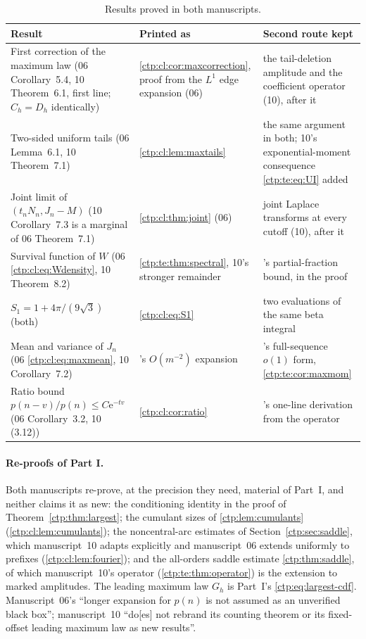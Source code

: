 \documentclass[11pt,a4paper]{article}
\numberwithin{equation}{section}
\theoremstyle{definition}
\theoremstyle{remark}
\newcommand{\e}{\mathrm e}
\begin{document}
\begin{table}[htbp]
\centering\small
\renewcommand{\arraystretch}{1.12}
\begin{tabular}{@{}>{\raggedright\arraybackslash}p{}>{\raggedright\arraybackslash}p{}>{\raggedright\arraybackslash}p{}@{}}
\toprule
Result & Printed as & Second route kept\\
\midrule
First correction of the maximum law (06 Corollary~5.4, 10 Theorem~6.1,
first line; $C_h=D_h$ identically) &
\cref{ctp:cl:cor:maxcorrection}, proof from the $L^1$ edge expansion
(06) &
the tail-deletion amplitude and the coefficient operator (10), after it\\
Two-sided uniform tails (06 Lemma~6.1, 10 Theorem~7.1) &
\cref{ctp:cl:lem:maxtails} &
the same argument in both; 10's exponential-moment consequence
\eqref{ctp:te:eq:UI} added\\
Joint limit of $(t_nN_n,J_n-M)$ (10 Corollary~7.3 is a marginal of 06
Theorem~7.1) &
\cref{ctp:cl:thm:joint} (06) &
joint Laplace transforms at every cutoff (10), after it\\
Survival function of $W$ (06 \eqref{ctp:cl:eq:Wdensity}, 10 Theorem~8.2) &
\cref{ctp:te:thm:spectral}, 10's stronger remainder &
06's partial-fraction bound, in the proof\\
$S_1=1+4\pi/(9\sqrt3)$ (both) &
\eqref{ctp:cl:eq:S1} &
two evaluations of the same beta integral\\
Mean and variance of $J_n$ (06 \eqref{ctp:cl:eq:maxmean}, 10
Corollary~7.2) &
06's $O(m^{-2})$ expansion &
10's full-sequence $o(1)$ form, \cref{ctp:te:cor:maxmom}\\
Ratio bound $p(n-v)/p(n)\le C\e^{-tv}$ (06 Corollary~3.2, 10 (3.12)) &
\cref{ctp:cl:cor:ratio} &
10's one-line derivation from the operator\\
\bottomrule
\end{tabular}
\caption{Results proved in both manuscripts.}
\label{ctp:cl:tab:shared}
\end{table}

\paragraph{Re-proofs of Part I.} Both manuscripts re-prove, at the
precision they need, material of Part~I, and neither claims it as new:
the conditioning identity in the proof of Theorem~\ref{ctp:thm:largest};
the cumulant sizes of \cref{ctp:lem:cumulants}
(\cref{ctp:cl:lem:cumulants}); the noncentral-arc estimates of
Section~\ref{ctp:sec:saddle}, which manuscript~10 adapts explicitly and
manuscript~06 extends uniformly to prefixes (\cref{ctp:cl:lem:fourier});
and the all-orders saddle estimate \cref{ctp:thm:saddle}, of which
manuscript~10's operator (\cref{ctp:te:thm:operator}) is the extension to
marked amplitudes. The leading maximum law $G_h$ is Part~I's
\eqref{ctp:eq:largest-cdf}. Manuscript~06's ``longer expansion for $p(n)$
is not assumed as an unverified black box''; manuscript~10 ``do[es] not
rebrand its counting theorem or its fixed-offset leading maximum law as
new results''.
\end{document}

